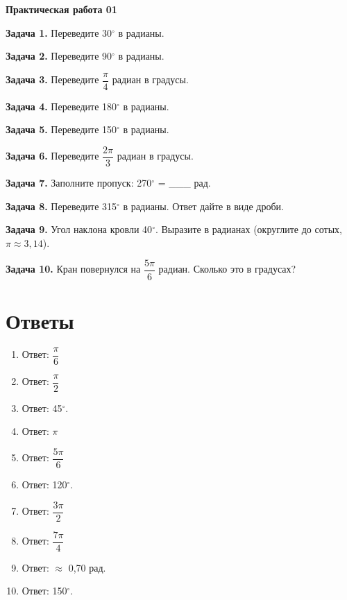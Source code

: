 \documentclass{umk-matematika}
\begin{document}
\begin{center}
{\Large\bfseries Практическая работа 01}
\end{center}
\vspace{0.5cm}

\textbf{Задача 1.} Переведите 30$^\circ$ в радианы.\par\vspace{10pt}
\textbf{Задача 2.} Переведите 90$^\circ$ в радианы.\par\vspace{10pt}
\textbf{Задача 3.} Переведите $\dfrac{\pi}{4}$ радиан в градусы.\par\vspace{10pt}
\textbf{Задача 4.} Переведите 180$^\circ$ в радианы.\par\vspace{10pt}
\textbf{Задача 5.} Переведите 150$^\circ$ в радианы.\par\vspace{10pt}
\textbf{Задача 6.} Переведите $\dfrac{2\pi}{3}$ радиан в градусы.\par\vspace{10pt}
\textbf{Задача 7.} Заполните пропуск: 270$^\circ$ = \_\_\_ рад.\par\vspace{10pt}
\textbf{Задача 8.} Переведите 315$^\circ$ в радианы. Ответ дайте в виде дроби.\par\vspace{10pt}
\textbf{Задача 9.} Угол наклона кровли 40$^\circ$. Выразите в радианах (округлите до сотых, $\pi \approx 3{,}14$).\par\vspace{10pt}
\textbf{Задача 10.} Кран повернулся на $\dfrac{5\pi}{6}$ радиан. Сколько это в градусах?\par\vspace{10pt}
\newpage
\section*{Ответы}

\begin{enumerate}
  \item Ответ: $\dfrac{\pi}{6}$
  \item Ответ: $\dfrac{\pi}{2}$
  \item Ответ: 45$^\circ$.
  \item Ответ: $\pi$
  \item Ответ: $\dfrac{5\pi}{6}$
  \item Ответ: 120$^\circ$.
  \item Ответ: $\dfrac{3\pi}{2}$
  \item Ответ: $\dfrac{7\pi}{4}$
  \item Ответ: $\approx$ 0,70 рад.
  \item Ответ: 150$^\circ$.
\end{enumerate}
\end{document}
